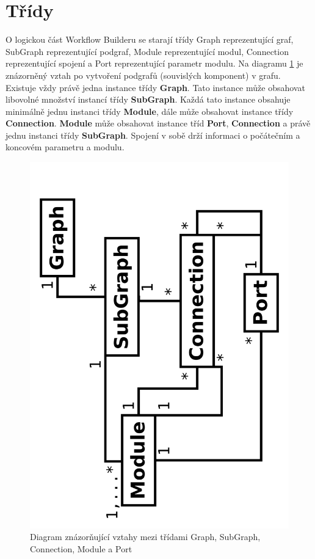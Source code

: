 \newpage
\section{Třídy}

O logickou část Workflow Builderu se starají třídy Graph reprezentující graf, SubGraph reprezentující podgraf, Module reprezentující modul, Connection reprezentující spojení a Port reprezentující parametr modulu. Na diagramu \figurename \ref{logClass} je znázorněný vztah po vytvoření podgrafů (souvislých komponent) v grafu. Existuje vždy právě jedna instance třídy \textbf{Graph}. Tato instance může obsahovat libovolné množství instancí třídy \textbf{SubGraph}. Každá tato instance obsahuje minimálně jednu instanci třídy \textbf{Module}, dále může obsahovat instance třídy \textbf{Connection}. \textbf{Module} může obsahovat instance tříd \textbf{Port}, \textbf{Connection} a právě jednu instanci třídy \textbf{SubGraph}. Spojení v sobě drží informaci o počátečním a koncovém parametru a modulu.

\begin{figure}[h]
	\begin{center}
		\includegraphics[scale=0.05,angle=-90]{pictures/wf/logClass.pdf}
		\caption{Diagram znázorňující vztahy mezi třídami Graph, SubGraph, Connection, Module a Port}
	  	\label{logClass}
	\end{center}
\end{figure}

